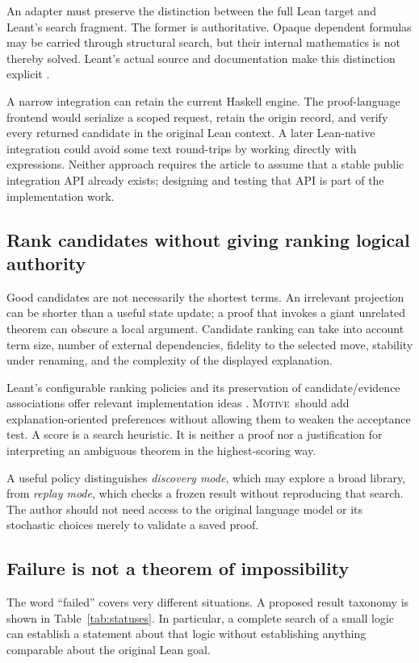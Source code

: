 \documentclass[11pt,a4paper]{article}
\newcommand{\Motive}{\textnormal{\textsc{Motive}}}
\theoremstyle{remark}
\begin{document}
An adapter must preserve the distinction between the full Lean target and Leant's search fragment. The former is authoritative. Opaque dependent formulas may be carried through structural search, but their internal mathematics is not thereby solved. Leant's actual source and documentation make this distinction explicit \cite{leant-fragment,leant-internals}.

A narrow integration can retain the current Haskell engine. The proof-language frontend would serialize a scoped request, retain the origin record, and verify every returned candidate in the original Lean context. A later Lean-native integration could avoid some text round-trips by working directly with expressions. Neither approach requires the article to assume that a stable public integration API already exists; designing and testing that API is part of the implementation work.

\subsection{Rank candidates without giving ranking logical authority}
Good candidates are not necessarily the shortest terms. An irrelevant projection can be shorter than a useful state update; a proof that invokes a giant unrelated theorem can obscure a local argument. Candidate ranking can take into account term size, number of external dependencies, fidelity to the selected move, stability under renaming, and the complexity of the displayed explanation.

Leant's configurable ranking policies and its preservation of candidate/evidence associations offer relevant implementation ideas \cite{leant-internals}. \Motive\ should add explanation-oriented preferences without allowing them to weaken the acceptance test. A score is a search heuristic. It is neither a proof nor a justification for interpreting an ambiguous theorem in the highest-scoring way.

A useful policy distinguishes \emph{discovery mode}, which may explore a broad library, from \emph{replay mode}, which checks a frozen result without reproducing that search. The author should not need access to the original language model or its stochastic choices merely to validate a saved proof.

\subsection{Failure is not a theorem of impossibility}
\label{sec:negative}
The word ``failed'' covers very different situations. A proposed result taxonomy is shown in Table~\ref{tab:statuses}. In particular, a complete search of a small logic can establish a statement about that logic without establishing anything comparable about the original Lean goal.
\end{document}
